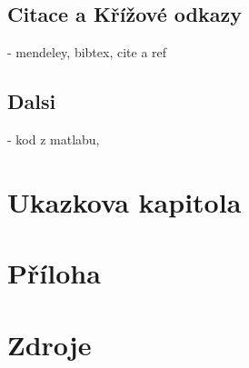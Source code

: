 \section{Citace a K\v{r}\'{i}\v{z}ov\'{e} odkazy}
- mendeley, bibtex, cite a ref


\section{Dalsi}
- kod z matlabu, 



\chapter{Ukazkova kapitola}
\label{chap:example_chapter}


\chapter{P\v{r}\'{i}loha}
\label{chap:appendix}

\chapter{Zdroje}
\label{chap:bib}





















